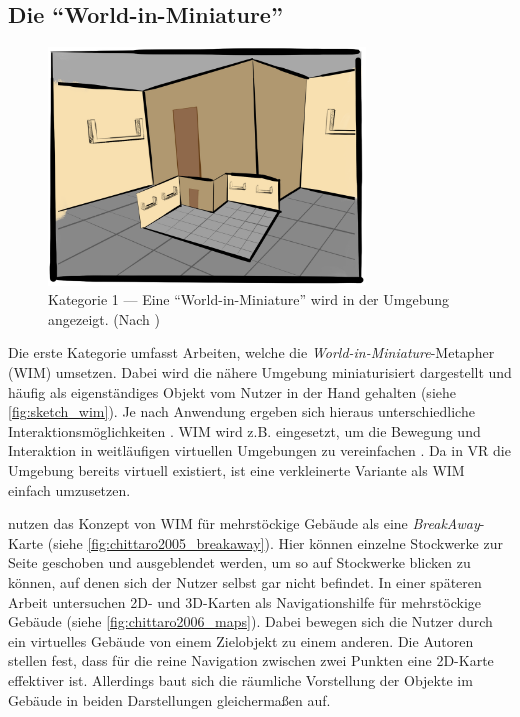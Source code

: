 \subsection{Die \enquote{World-in-Miniature}}
\begin{figure}[ht]
    \centering
    \includegraphics[width=0.75\textwidth]{figures/sketch_wim.png}
    \caption{Kategorie 1 --- Eine \enquote{World-in-Miniature} wird in der Umgebung angezeigt. (Nach \textcite[265]{Stoakley1995})}
    \label{fig:sketch_wim}
\end{figure}

Die erste Kategorie umfasst Arbeiten, welche die \emph{World-in-Miniature}-Metapher (WIM) umsetzen.
Dabei wird die nähere Umgebung miniaturisiert dargestellt und häufig als eigenständiges Objekt vom Nutzer in der Hand gehalten (siehe \autoref{fig:sketch_wim}).
Je nach Anwendung ergeben sich hieraus unterschiedliche Interaktionsmöglichkeiten \parencite{Stoakley1995}.
WIM wird z.B. eingesetzt, um die Bewegung und Interaktion in weitläufigen virtuellen Umgebungen zu vereinfachen \parencites[vgl.]{Trueba2010}{Elvezio2017}.
Da in VR die Umgebung bereits virtuell existiert, ist eine verkleinerte Variante als WIM einfach umzusetzen.

\textcite{Chittaro2005} nutzen das Konzept von WIM für mehrstöckige Gebäude als eine \emph{BreakAway}-Karte (siehe \autoref{fig:chittaro2005_breakaway}).
Hier können einzelne Stockwerke zur Seite geschoben und ausgeblendet werden, um so auf Stockwerke blicken zu können, auf denen sich der Nutzer selbst gar nicht befindet.
In einer späteren Arbeit untersuchen \textcite{Chittaro2006} 2D- und 3D-Karten als Navigationshilfe für mehrstöckige Gebäude (siehe \autoref{fig:chittaro2006_maps}).
Dabei bewegen sich die Nutzer durch ein virtuelles Gebäude von einem Zielobjekt zu einem anderen.
Die Autoren stellen fest, dass für die reine Navigation zwischen zwei Punkten eine 2D-Karte effektiver ist.
Allerdings baut sich die räumliche Vorstellung der Objekte im Gebäude in beiden Darstellungen gleichermaßen auf.


